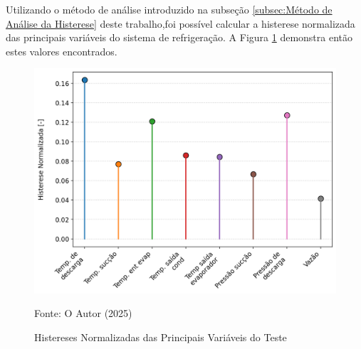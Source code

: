  Utilizando o método de análise introduzido na subseção \ref{subsec:Método de Análise da Histerese} deste trabalho,foi possível  calcular a histerese normalizada das principais variáveis do sistema de refrigeração. A Figura \ref{fig:histereses normalizadas} demonstra então estes valores encontrados.
 \newpage
\begin{figure}[h] 

    \centering
    \includegraphics[width=1\linewidth]{FigurasdoTexto/Histereses Normalizadas.png}
    \caption{Histereses Normalizadas das Principais Variáveis do Teste}
    \label{fig:histereses normalizadas}
    {\footnotesize Fonte: O Autor (2025)}
\end{figure}

